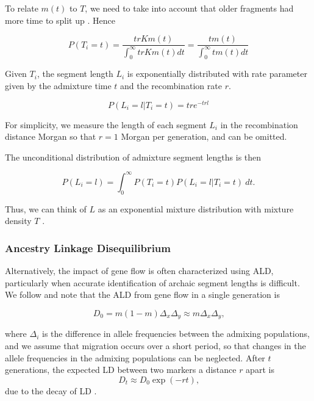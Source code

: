 \documentclass[11pt]{article}
\begin{document}
To relate $m(t)$ to $T$, we need to take into account that older fragments had more time to split up \citep{pool_inference_2009}. Hence

\begin{equation}
	P(T_i=t) = \frac{t r K m(t)}{\int_0^{\infty} t r K  m(t) dt} = \frac{t m(t)}{\int_0^{\infty} t m(t) dt} \label{eq:reweighting}
\end{equation}


Given $T_i$, the segment length $L_i$ is exponentially distributed with rate parameter given by the admixture time $t$ and the recombination rate $r$.

\begin{equation}
 \label{eq:generall_length_distribution}
    P(L_i=l|T_i=t) = t r e^{-t r l} 
\end{equation}
	
For simplicity, we measure the length of each segment $L_i$ in the recombination distance Morgan so that $r=1$ Morgan per generation, and can be omitted.
	
The unconditional distribution of admixture segment lengths is then
	
\begin{equation}
\label{eq:standard_likelihood_definintion}
    P(L_i=l)=\int_{0}^{\infty} P(T_i=t) P(L_i=l | T_i=t) \ dt \text{.}
\end{equation}
	
	
Thus, we can think of $L$ as an exponential mixture distribution with mixture density $T$ \citep{ralph_geography_2013, zhou_modeling_2017}.
	
\subsubsection{Ancestry Linkage Disequilibrium}
Alternatively, the impact of gene flow is often characterized using ALD, particularly when accurate identification of archaic segment lengths is difficult. We follow \cite{loh_inferring_2013} and note that the ALD from gene flow in a single generation is

\begin{equation}
    D_0 = m(1-m)\Delta_x \Delta_y \approx m \Delta_x\Delta_y\text{,} \label{eq:ald_general}
\end{equation}

where $\Delta_i$ is the difference in allele frequencies between the admixing populations, and we assume that migration occurs over a short period, so that changes in the allele frequencies in the admixing populations can be neglected. After $t$ generations, the expected LD between two markers a distance $r$ apart is
\begin{equation}
    D_t \approx D_0 \exp(-rt)\text{,}
\end{equation}
due to the decay of LD \cite[e.g.][]{sankararaman_date_2012}. 
\end{document}
